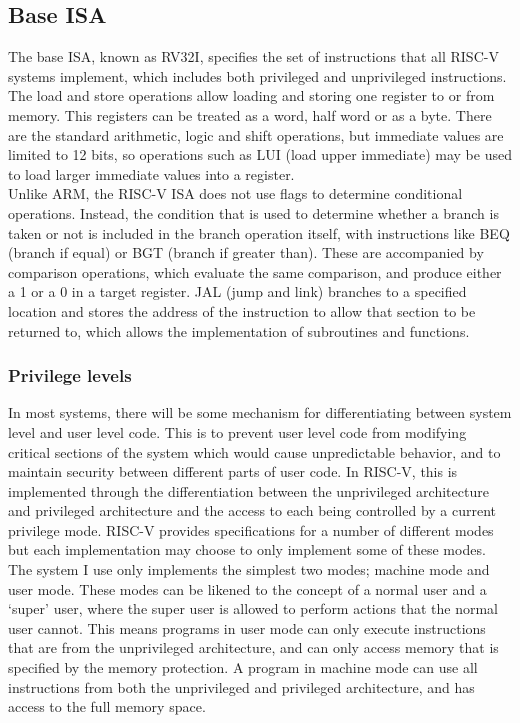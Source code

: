 \subsection{Base ISA}
The base ISA, known as RV32I, specifies the set of instructions that all RISC-V systems implement, which includes both privileged and unprivileged instructions. The load and store operations allow loading and storing one register to or from memory. This registers can be treated as a word, half word or as a byte. There are the standard arithmetic, logic and shift operations, but  immediate values are limited to 12 bits, so operations such as LUI (load upper immediate) may be used to load larger immediate values into a register.\\
Unlike ARM, the RISC-V ISA does not use flags to determine conditional operations. Instead, the condition that is used to determine whether a branch is taken or not is included in the branch operation itself, with instructions like BEQ (branch if equal) or BGT (branch if greater than). These are accompanied by comparison operations, which evaluate the same comparison, and produce either a 1 or a 0 in a target register. JAL (jump and link) branches to a specified location and stores the address of the instruction to allow that section to be returned to, which allows the implementation of subroutines and functions\cite{riscv_unpriv}.
\subsubsection{Privilege levels}
In most systems, there will be some mechanism for differentiating between system level and user level code. This is to prevent user level code from modifying critical sections of the system which would cause unpredictable behavior, and to maintain security between different parts of user code. In RISC-V, this is implemented through the differentiation between the unprivileged architecture and privileged architecture and the access to each being controlled by a current privilege mode. RISC-V provides specifications for a number of different modes but each implementation may choose to only implement some of these modes. The system I use only implements the simplest two modes; machine mode and user mode. These modes can be likened to the concept of a normal user and a `super' user, where the super user is allowed to perform actions that the normal user cannot. This means programs in user mode can only execute instructions that are from the unprivileged architecture, and can only access memory that is specified by the memory protection. A program in machine mode can use all instructions from both the unprivileged and privileged architecture, and has access to the full memory space.
